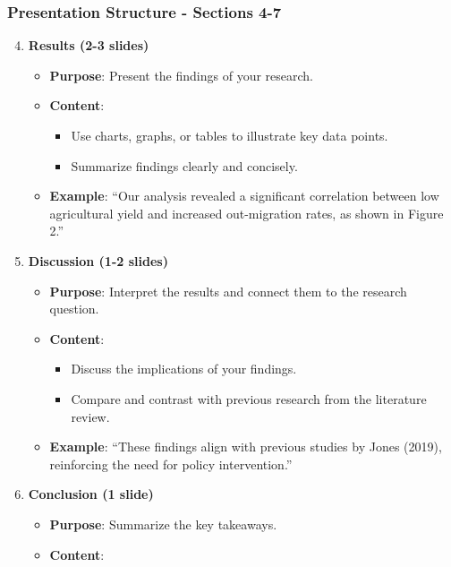 \documentclass[aspectratio=169]{beamer}
\begin{document}
\begin{frame}[fragile]
    \frametitle{Presentation Structure - Sections 4-7}
    \begin{enumerate}
        \setcounter{enumi}{3} %
        \item \textbf{Results (2-3 slides)}
            \begin{itemize}
                \item \textbf{Purpose}: Present the findings of your research.
                \item \textbf{Content}:
                    \begin{itemize}
                        \item Use charts, graphs, or tables to illustrate key data points.
                        \item Summarize findings clearly and concisely.
                    \end{itemize}
                \item \textbf{Example}: ``Our analysis revealed a significant correlation between low agricultural yield and increased out-migration rates, as shown in Figure 2.''
            \end{itemize}
        \item \textbf{Discussion (1-2 slides)}
            \begin{itemize}
                \item \textbf{Purpose}: Interpret the results and connect them to the research question.
                \item \textbf{Content}:
                    \begin{itemize}
                        \item Discuss the implications of your findings.
                        \item Compare and contrast with previous research from the literature review.
                    \end{itemize}
                \item \textbf{Example}: ``These findings align with previous studies by Jones (2019), reinforcing the need for policy intervention.''
            \end{itemize}
        \item \textbf{Conclusion (1 slide)}
            \begin{itemize}
                \item \textbf{Purpose}: Summarize the key takeaways.
                \item \textbf{Content}:

\end{itemize}
\end{enumerate}
\end{frame}
\end{document}
